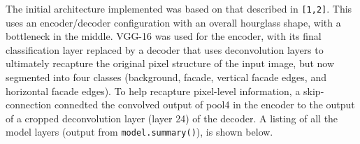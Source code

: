 The initial architecture implemented was based on that described in \verb|[1,2]|. This uses an
encoder/decoder configuration with an overall hourglass shape, with a bottleneck in the middle. 
VGG-16 was used for the encoder, with its final classification layer replaced by a decoder that 
uses deconvolution layers to ultimately recapture the original pixel structure of the input image, 
but now segmented into four classes (background, facade, vertical facade edges, and horizontal facade edges). 
To help recapture pixel-level information, a skip-connection connedted the convolved output 
of pool4 in the encoder to the output of a cropped deconvolution layer (layer 24) of the decoder.
A listing of all the model layers (output from \verb|model.summary()|), is shown below.
\begin{Verbatim}[fontsize=\scriptsize]


\end{Verbatim}
